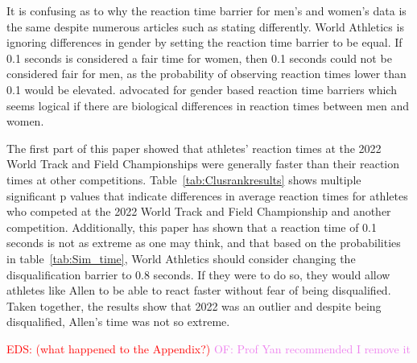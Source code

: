 \documentclass[12pt, letterpaper, titlepage]{article}
\newcommand{\eds}[1]{\textcolor{red}{EDS: (#1)}}
\newcommand{\of}[1]{\textcolor{violet}{OF: #1}}
\begin{document}
It is confusing as to why the reaction time barrier for men's and women's data
is the same despite numerous articles such as \citep[e.g.,][]{lipps2011implications, 
babicc2009reaction, panoutsakopoulos2020gender} stating differently.  World
Athletics is ignoring differences in gender by setting the reaction time barrier
to be equal. If 0.1 seconds is considered a fair time for women, then 0.1 seconds
could not be considered fair for men, as the probability of observing reaction
times lower than 0.1 would be elevated.  \citet{brosnan2017effects} advocated
for gender based reaction time barriers which seems logical if there are biological
differences in reaction times between men and women.


The first part of this paper showed that athletes' reaction times at the 2022 
World Track and Field Championships were generally faster than their reaction 
times at other competitions. Table~\ref{tab:Clusrankresults} shows multiple 
significant p values that indicate differences in average reaction times for 
athletes who competed at the 2022 World Track and Field Championship and another
competition.  Additionally, this paper has shown that a reaction time of 0.1 
seconds is not as extreme as one may think, and that based on the probabilities
in table~\ref{tab:Sim_time}, World Athletics should consider changing the 
disqualification barrier to 0.8 seconds.  If they were to do so, they would 
allow athletes like Allen to be able to react faster without fear of being 
disqualified.  Taken together, the results show that 2022 was an outlier and 
despite being disqualified, Allen's time was not so extreme.


\eds{what happened to the Appendix?}
\of{Prof Yan recommended I remove it}




\end{document}
